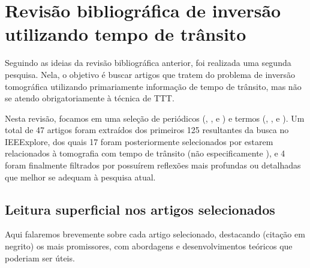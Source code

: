 \section{Revisão bibliográfica de inversão utilizando tempo de trânsito}
\label{sec_rt}
Seguindo as ideias da revisão bibliográfica anterior, foi realizada uma segunda pesquisa. Nela, o objetivo é buscar artigos que tratem do problema de inversão tomográfica utilizando primariamente informação de tempo de trânsito, mas não se atendo obrigatoriamente à técnica de TTT.

Nesta revisão, focamos em uma seleção de periódicos (, , e ) e termos (, , e ). Um total de 47 artigos foram extraídos dos primeiros 125 resultantes da busca no IEEExplore, dos quais 17 foram posteriormente selecionados por estarem relacionados à tomografia com tempo de trânsito (não especificamente ), e 4 foram finalmente filtrados por possuírem reflexões mais profundas ou detalhadas que melhor se adequam à pesquisa atual.

\subsection{Leitura superficial nos artigos selecionados}

Aqui falaremos brevemente sobre cada artigo selecionado, destacando (citação em negrito) os mais promissores, com abordagens e desenvolvimentos teóricos que poderiam ser úteis.

